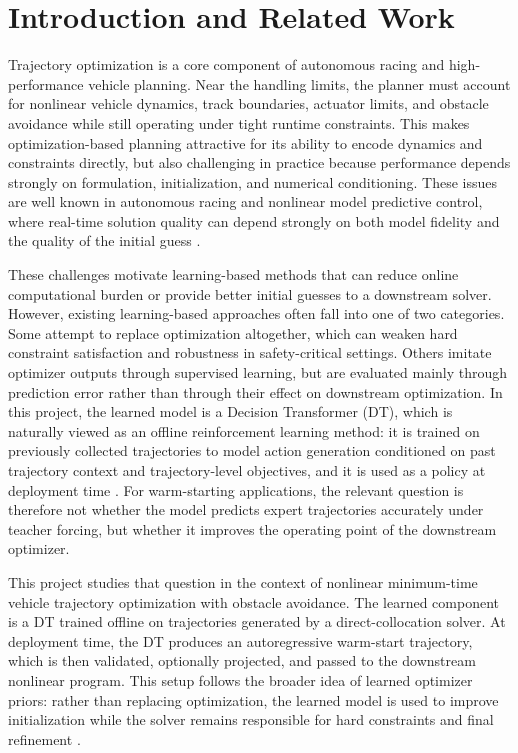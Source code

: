 \section{Introduction and Related Work}

Trajectory optimization is a core component of autonomous racing and high-performance vehicle planning. Near the handling limits, the planner must account for nonlinear vehicle dynamics, track boundaries, actuator limits, and obstacle avoidance while still operating under tight runtime constraints. This makes optimization-based planning attractive for its ability to encode dynamics and constraints directly, but also challenging in practice because performance depends strongly on formulation, initialization, and numerical conditioning. These issues are well known in autonomous racing and nonlinear model predictive control, where real-time solution quality can depend strongly on both model fidelity and the quality of the initial guess \cite{kapania2015sequential,subosits2020road,subosits2021fidelity,wachter2006implementation}.

These challenges motivate learning-based methods that can reduce online computational burden or provide better initial guesses to a downstream solver. However, existing learning-based approaches often fall into one of two categories. Some attempt to replace optimization altogether, which can weaken hard constraint satisfaction and robustness in safety-critical settings. Others imitate optimizer outputs through supervised learning, but are evaluated mainly through prediction error rather than through their effect on downstream optimization. In this project, the learned model is a Decision Transformer (DT), which is naturally viewed as an offline reinforcement learning method: it is trained on previously collected trajectories to model action generation conditioned on past trajectory context and trajectory-level objectives, and it is used as a policy at deployment time \cite{chen2021decision}. For warm-starting applications, the relevant question is therefore not whether the model predicts expert trajectories accurately under teacher forcing, but whether it improves the operating point of the downstream optimizer.

This project studies that question in the context of nonlinear minimum-time vehicle trajectory optimization with obstacle avoidance. The learned component is a DT trained offline on trajectories generated by a direct-collocation solver. At deployment time, the DT produces an autoregressive warm-start trajectory, which is then validated, optionally projected, and passed to the downstream nonlinear program. This setup follows the broader idea of learned optimizer priors: rather than replacing optimization, the learned model is used to improve initialization while the solver remains responsible for hard constraints and final refinement \cite{guffanti2024art,celestini2024transformermpc}.

